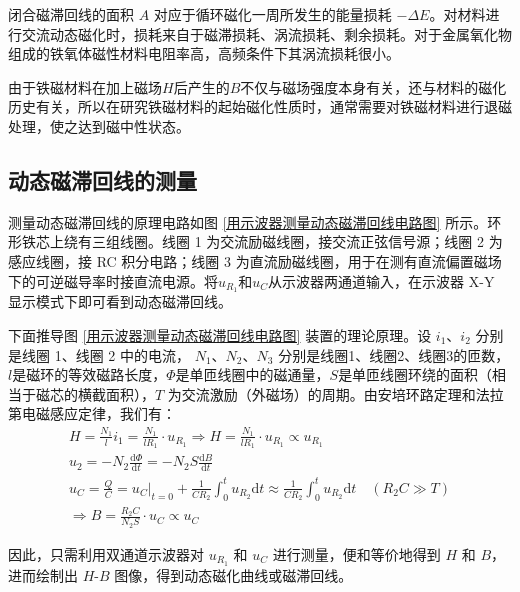 \documentclass[UTF8]{article}
\theoremstyle{MyLineTheoremStyle} %
\theoremstyle{MyBlockTheoremStyle} %
\theoremstyle{MySubsubsectionStyle} %
\begin{document}
闭合磁滞回线的面积 $A$ 对应于循环磁化一周所发生的能量损耗 $-\Delta E$。对材料进行交流动态磁化时，损耗来自于磁滞损耗、涡流损耗、剩余损耗。对于金属氧化物组成的铁氧体磁性材料电阻率高，高频条件下其涡流损耗很小。

由于铁磁材料在加上磁场$ H $后产生的$ B $不仅与磁场强度本身有关，还与材料的磁化历史有关，所以在研究铁磁材料的起始磁化性质时，通常需要对铁磁材料进行退磁处理，使之达到磁中性状态。

\subsection{动态磁滞回线的测量}
测量动态磁滞回线的原理电路如图 \ref{用示波器测量动态磁滞回线电路图} 所示。环形铁芯上绕有三组线圈。线圈 1 为交流励磁线圈，接交流正弦信号源；线圈 2 为感应线圈，接 RC 积分电路；线圈 3 为直流励磁线圈，用于在测有直流偏置磁场下的可逆磁导率时接直流电源。将$ u_{R_1} $和$ u_C $从示波器两通道输入，在示波器 X-Y 显示模式下即可看到动态磁滞回线。

下面推导图 \ref{用示波器测量动态磁滞回线电路图} 装置的理论原理。设 $i_1$、$i_2$ 分别是线圈 1、线圈 2 中的电流， $ N_1 $、$N_2$、$N_3$ 分别是线圈1、线圈2、线圈3的匝数，$ l $是磁环的等效磁路长度，$ \Phi $是单匝线圈中的磁通量，$ S $是单匝线圈环绕的面积（相当于磁芯的横截面积），$T$ 为交流激励（外磁场）的周期。由安培环路定理和法拉第电磁感应定律，我们有：
\begin{gather}
H = \frac{N_1}{l}i_1 = \frac{N_1}{lR_1}\cdot u_{R_1} \Longrightarrow \boxed{
    H = \frac{N_1}{lR_1}\cdot u_{R_1} \propto u_{R_1}
} 
\\ 
u_2 = - N_2 \frac{\mathrm{d} \Phi }{\mathrm{d} t } = - N_2S \frac{\mathrm{d} B }{\mathrm{d} t } 
\\ 
u_C = \frac{Q}{C} = u_C|_{t = 0} + \frac{1}{CR_2} \int_{0}^{t} u_{R_2}\mathrm{d}t \approx \frac{1}{CR_2} \int_{0}^{t} u_{R_2}\mathrm{d}t \quad  (R_2 C \gg T) 
\\
\Longrightarrow \boxed{
    B = \frac{R_2 C}{N_2 S}\cdot u_C \propto u_C
}
\end{gather}

因此，只需利用双通道示波器对 $u_{R_1}$ 和 $u_C$ 进行测量，便和等价地得到 $H$ 和 $B$，进而绘制出 $H$-$B$ 图像，得到动态磁化曲线或磁滞回线。
\end{document}

